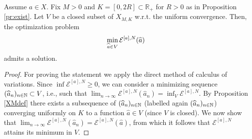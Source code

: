 \begin{proposition}\label{ENmin}
Assume $a \in X$. Fix $M > 0$ and $K=[0,2R] \subset  \mathbb R_+$ for $R>0$ as in Proposition \ref{pr:exist}. Let $V$ be a closed subset of $X_{M,K}$ w.r.t. the uniform convergence. Then, the optimization problem
\begin{align*}
	\min_{\widehat a \in V} \mathcal E^{[a],N}(\widehat a)
\end{align*}
admits a solution.
\end{proposition}
\begin{proof} For proving the statement we apply the direct method of calculus of variations.
Since $\inf \mathcal E^{[a],N} \geq 0$, we can consider a minimizing sequence $(\widehat a_n)_{n \in \mathbb{N}} \subset V$, i.e., such that $\lim_{n \rightarrow \infty}  \mathcal E^{[a],N} (\widehat a_n) = \inf_{V}  \mathcal E^{[a],N} $. By Proposition \ref{XMdef} there exists a subsequence of $(\widehat a_n)_{n \in \mathbb{N}}$ (labelled again $(\widehat a_n)_{n \in \mathbb{N}}$) converging uniformly on $K$ to a function $\widehat a \in V$ (since $V$ is closed). We now show that $\lim_{n \rightarrow \infty}  \mathcal E^{[a],N} (\widehat a_n) =  \mathcal E^{[a],N} (\widehat a)$, from which it follows  that $ \mathcal E^{[a],N} $ attains its minimum in $V$. 


\end{proof}
